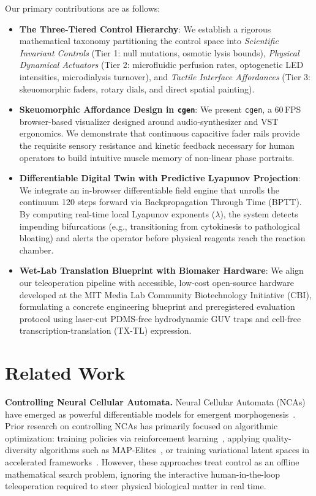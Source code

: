 \documentclass{article}
\begin{document}
Our primary contributions are as follows:
\begin{itemize}
    \item \textbf{The Three-Tiered Control Hierarchy}: We establish a rigorous mathematical taxonomy partitioning the control space into \textit{Scientific Invariant Controls} (Tier 1: null mutations, osmotic lysis bounds), \textit{Physical Dynamical Actuators} (Tier 2: microfluidic perfusion rates, optogenetic LED intensities, microdialysis turnover), and \textit{Tactile Interface Affordances} (Tier 3: skeuomorphic faders, rotary dials, and direct spatial painting).
    \item \textbf{Skeuomorphic Affordance Design in \texttt{cgen}}: We present \texttt{cgen}, a 60\,FPS browser-based visualizer designed around audio-synthesizer and VST ergonomics. We demonstrate that continuous capacitive fader rails provide the requisite sensory resistance and kinetic feedback necessary for human operators to build intuitive muscle memory of non-linear phase portraits.
    \item \textbf{Differentiable Digital Twin with Predictive Lyapunov Projection}: We integrate an in-browser differentiable field engine that unrolls the continuum 120 steps forward via Backpropagation Through Time (BPTT). By computing real-time local Lyapunov exponents ($\lambda$), the system detects impending bifurcations (e.g., transitioning from cytokinesis to pathological bloating) and alerts the operator before physical reagents reach the reaction chamber.
    \item \textbf{Wet-Lab Translation Blueprint with Biomaker Hardware}: We align our teleoperation pipeline with accessible, low-cost open-source hardware developed at the MIT Media Lab Community Biotechnology Initiative (CBI), formulating a concrete engineering blueprint and preregistered evaluation protocol using laser-cut PDMS-free hydrodynamic GUV traps and cell-free transcription-translation (TX-TL) expression.
\end{itemize}

\section{Related Work}

\textbf{Controlling Neural Cellular Automata.} Neural Cellular Automata (NCAs) have emerged as powerful differentiable models for emergent morphogenesis~\citep{mordvintsev2020growing, niklasson2021asynchronous}. Prior research on controlling NCAs has primarily focused on algorithmic optimization: training policies via reinforcement learning~\citep{sudhakaran2021goal}, applying quality-diversity algorithms such as MAP-Elites~\citep{mouret2015illuminating}, or training variational latent spaces in accelerated frameworks~\citep{chan2020lenia, tallec2025cax, chen2018neural}. However, these approaches treat control as an offline mathematical search problem, ignoring the interactive human-in-the-loop teleoperation required to steer physical biological matter in real time.
\end{document}
